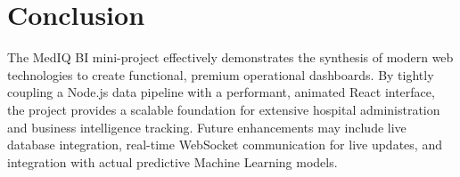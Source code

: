 \documentclass[12pt,a4paper]{report}
\begin{document}
\chapter{Conclusion}
The MedIQ BI mini-project effectively demonstrates the synthesis of modern web technologies to create functional, premium operational dashboards. By tightly coupling a Node.js data pipeline with a performant, animated React interface, the project provides a scalable foundation for extensive hospital administration and business intelligence tracking. Future enhancements may include live database integration, real-time WebSocket communication for live updates, and integration with actual predictive Machine Learning models.
\end{document}
